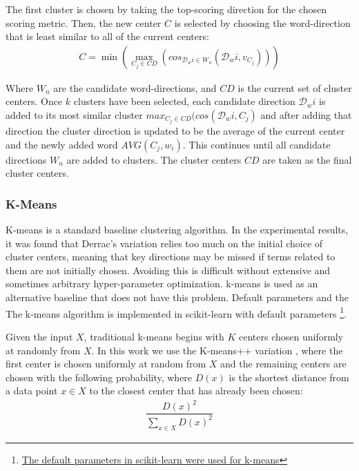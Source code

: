 The first cluster  is chosen by taking the top-scoring direction for the chosen scoring metric. Then, the new center $C$ is selected by choosing the word-direction that is least similar to all of the current centers:
\begin{align}
C = \min(\max_{C_j \in {CD}}({cos_{\mathcal{D}_wi \in W_n}(\mathcal{D}_wi, v_{C_j})}))
\end{align}

Where $W_n$ are the candidate word-directions, and $CD$ is the current set of cluster centers. Once $k$ clusters have been selected,  each candidate direction $\mathcal{D}_wi$  is added to its most similar cluster $max_{C_j \in {CD}}(cos(\mathcal{D}_wi, C_j)$ and after adding that direction the cluster direction is updated to be the average of the current center and the newly added word ${AVG}(C_j, w_i)$. This continues until all candidate directions $W_n$ are added to clusters. The cluster centers $CD$ are taken as the final cluster centers.


\subsubsection{K-Means} \label{bg:kmeans}

K-means is a standard baseline clustering algorithm. In the experimental results, it was found that Derrac's variation relies too much on the initial choice of cluster centers, meaning  that key directions may be missed if terms related to them are not initially chosen. Avoiding this is difficult without extensive and sometimes arbitrary hyper-parameter optimization. k-means is used as an alternative baseline that does not have this problem. Default parameters and the The k-means algorithm is implemented in scikit-learn with default parameters \footnote{\href{https://scikit-learn.org/stable/modules/generated/sklearn.cluster.KMeans.html}{The default parameters in  scikit-learn were used for k-means}}.

Given the input $X$, traditional k-means  begins with $K$ centers chosen uniformly at randomly from $X$. In this work we use the K-means++ variation \cite{Arthur}, where the first center is chosen uniformly at random from $X$ and the remaining centers are chosen with the following probability, where $D(x)$ is the shortest distance from a data point $x \in X$ to the closest center that has already been chosen:
\begin{align}
\dfrac{D(x)^2}{\sum_{x \in X} D(x)^2} 
\end{align}


